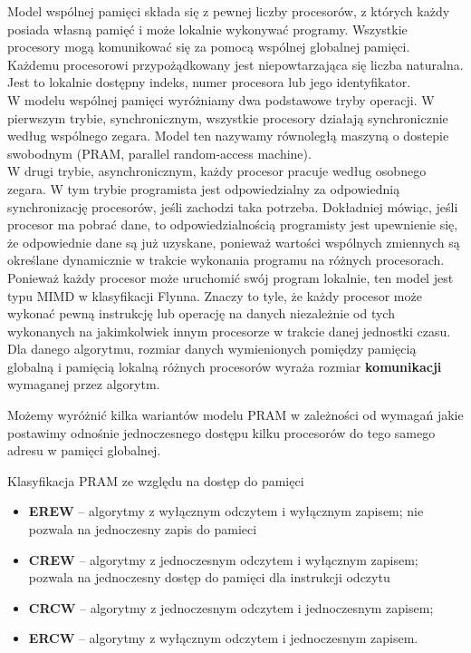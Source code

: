 Model wspólnej pamięci składa się z pewnej liczby procesorów, z których każdy posiada własną pamięć i może lokalnie wykonywać programy. Wszystkie procesory mogą komunikować się za pomocą wspólnej globalnej pamięci.\\
Każdemu procesorowi przypożądkowany jest niepowtarzająca się liczba naturalna. Jest to lokalnie dostępny indeks, numer procesora lub jego identyfikator.\\

W modelu wspólnej pamięci wyróżniamy dwa podstawowe tryby operacji. W pierwszym trybie, synchronicznym, wszystkie procesory działają synchronicznie według wspólnego zegara. Model ten nazywamy równoległą maszyną o dostepie swobodnym (PRAM, parallel random-access machine).\\
W drugi trybie, asynchronicznym, każdy procesor pracuje według osobnego zegara. W tym trybie programista jest odpowiedzialny za odpowiednią synchronizację procesorów, jeśli zachodzi taka potrzeba. Dokładniej mówiąc, jeśli procesor ma pobrać dane, to odpowiedzialnością programisty jest upewnienie się, że odpowiednie dane są już uzyskane, ponieważ wartości wspólnych zmiennych są określane dynamicznie w trakcie wykonania programu na różnych procesorach.\\

Ponieważ każdy procesor może uruchomić swój program lokalnie, ten model jest typu MIMD w klasyfikacji Flynna. Znaczy to tyle, że każdy procesor może wykonać pewną instrukcję lub operację na danych niezależnie od tych wykonanych na jakimkolwiek innym procesorze w trakcie danej jednostki czasu.\\

Dla danego algorytmu, rozmiar danych wymienionych pomiędzy pamięcią globalną i pamięcią lokalną różnych procesorów wyraża rozmiar \textbf{komunikacji} wymaganej przez algorytm.



Możemy wyróżnić kilka wariantów modelu PRAM w zależności od wymagań jakie postawimy odnośnie jednoczesnego dostępu kilku procesorów do tego samego adresu w pamięci globalnej.\\
\begin{definicja}{Klasyfikacja PRAM ze względu na dostęp do pamięci}
\begin{itemize}
\item\textbf{EREW} -- algorytmy z wyłącznym odczytem i wyłącznym zapisem; nie pozwala na jednoczesny zapis do pamieci\\
\item\textbf{CREW} -- algorytmy z jednoczesnym odczytem i wyłącznym zapisem; pozwala na jednoczesny  dostęp do pamięci dla instrukcji odczytu\\
\item\textbf{CRCW} -- algorytmy z jednoczesnym odczytem i jednoczesnym zapisem;\\
\item\textbf{ERCW} -- algorytmy z wyłącznym odczytem i jednoczesnym zapisem.\\
\end{itemize}
\end{definicja}

